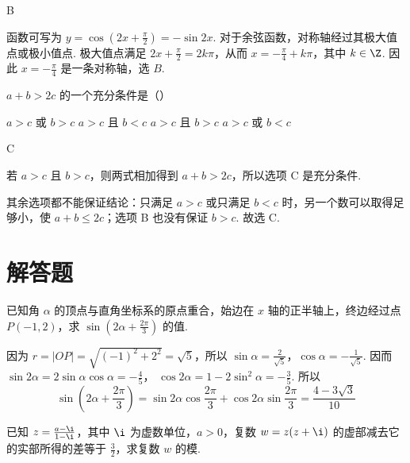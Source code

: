 \begin{answer}
B
\end{answer}

\begin{solution}
函数可写为 \(y=\cos\left(2x+\frac\pi2\right)=-\sin 2x\). 对于余弦函数，对称轴经过其极大值点或极小值点. 极大值点满足
\(2x+\frac\pi2=2k\pi\)，从而 \(x=-\frac\pi4+k\pi\)，其中 \(k\in\Z\). 因此 \(x=-\frac\pi4\) 是一条对称轴，选 \(B\).
\end{solution}

\begin{problem}
\(a + b > 2c\) 的一个充分条件是（\quad）

\choices
    {\(a > c\) 或 \(b > c\)}
    {\(a > c\) 且 \(b < c\)}
    {\(a > c\) 且 \(b > c\)}
    {\(a > c\) 或 \(b < c\)}
\end{problem}

\begin{answer}
C
\end{answer}

\begin{solution}
若 \(a>c\) 且 \(b>c\)，则两式相加得到 \(a+b>2c\)，所以选项 C 是充分条件.

其余选项都不能保证结论：只满足 \(a>c\) 或只满足 \(b<c\) 时，另一个数可以取得足够小，使 \(a+b\leqslant2c\)；选项 B 也没有保证 \(b>c\). 故选 C.
\end{solution}

\section{解答题}

\begin{problem}
已知角 \(\alpha\) 的顶点与直角坐标系的原点重合，始边在 \(x\) 轴的正半轴上，终边经过点 \(P(-1,2)\)，求 \(\sin \left(2\alpha + \frac{2\pi}{3}\right)\) 的值.
\end{problem}

\begin{solution}
因为 \(r = |OP| = \sqrt{(-1)^2 + 2^2} = \sqrt{5}\)，所以
\(\sin \alpha = \frac{2}{\sqrt{5}}\)，\(\cos \alpha = -\frac{1}{\sqrt{5}}\). 因而
\(\sin 2\alpha = 2\sin \alpha\cos \alpha = -\frac{4}{5}\)，
\(\cos 2\alpha = 1 - 2\sin^2\alpha = -\frac{3}{5}\). 所以
\[
\sin\left(2\alpha + \frac{2\pi}{3}\right)
= \sin 2\alpha\cos\frac{2\pi}{3} + \cos 2\alpha\sin\frac{2\pi}{3}
= \frac{4 - 3\sqrt{3}}{10}
\]
\end{solution}

\begin{problem}
已知 \(z = \frac{a - \i}{1 - \i}\)，其中 \(\i\) 为虚数单位，\(a > 0\)，复数 \(w = z(z + \i)\) 的虚部减去它的实部所得的差等于 \(\frac{3}{2}\)，求复数 \(w\) 的模.
\end{problem}

